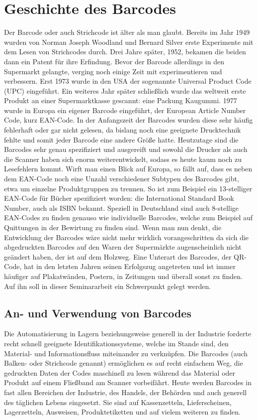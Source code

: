 \section{Geschichte des Barcodes}
Der Barcode oder auch Strichcode ist älter als man glaubt. Bereits im Jahr 1949 wurden von Norman Joseph Woodland und Bernard Silver erste Experimente mit dem Lesen von Strichcodes durch. Drei Jahre später, 1952, bekamen die beiden dann ein Patent für ihre Erfindung. 
Bevor der Barcode allerdings in den Supermarkt gelangte, verging noch einige Zeit mit experimentieren und verbessern. Erst 1973 wurde in den USA der sogenannte Universal Product Code (UPC) eingeführt. Ein weiteres Jahr später schließlich wurde das weltweit erste Produkt an einer Supermarktkasse gescannt: eine Packung Kaugummi.
1977 wurde in Europa ein eigener Barcode eingeführt, der European Article Number Code, kurz EAN-Code. 
In der Anfangszeit der Barcodes wurden diese sehr häufig fehlerhaft oder gar nicht gelesen, da bislang noch eine geeignete Drucktechnik fehlte und somit jeder Barcode eine andere Größe hatte. Heutzutage sind die Barcodes sehr genau spezifiziert und ausgereift und sowohl die Drucker als auch die Scanner haben sich enorm weiterentwickelt, sodass es heute kaum noch zu Lesefehlern kommt.
Wirft man einen Blick auf Europa, so fällt auf, dass es neben dem EAN-Code noch eine Unzahl verschiedener Subtypen des Barcodes gibt, etwa um einzelne Produktgruppen zu trennen. So ist zum Beispiel ein 13-stelliger EAN-Code für Bücher spezifiziert worden: die International Standard Book Number, auch als ISBN bekannt. Speziell in Deutschland sind auch 8-stellige EAN-Codes zu finden genauso wie individuelle Barcodes, welche zum Beispiel auf Quittungen in der Bewirtung zu finden sind.
Wenn man nun denkt, die Entwicklung der Barcodes wäre nicht mehr wirklich vorangeschritten da sich die abgedruckten Barcodes auf den Waren der Supermärkte augenscheinlich nicht geändert haben, der ist auf dem Holzweg. Eine Unterart des Barcodes, der QR-Code, hat in den letzten Jahren seinen Erfolgszug angetreten und ist immer häufiger auf Plakatwänden, Postern, in Zeitungen und überall sonst zu finden\cite{Ploetz2015}. Auf ihn soll in dieser Seminararbeit ein Schwerpunkt gelegt werden.

\subsection{An- und Verwendung von Barcodes}
Die Automatisierung in Lagern beziehungsweise generell in der Industrie forderte recht schnell geeignete Identifikationssysteme, welche im Stande sind, den Material- und Informationsfluss miteinander zu verknüpfen. Die Barcodes (auch Balken- oder Strichcode genannt) ermöglichen es auf recht einfachem Weg, die gedruckten Daten der Codes maschinell zu lesen während das Material oder Produkt auf einem Fließband am Scanner vorbeifährt. Heute werden Barcodes in fast allen Bereichen der Industrie, des Handels, der Behörden und auch generell des täglichen Lebens eingesetzt. Sie sind auf Kassenzetteln, Lieferscheinen, Lagerzetteln, Ausweisen, Produktetiketten und auf vielem weiteren zu finden.
\pagebreak

